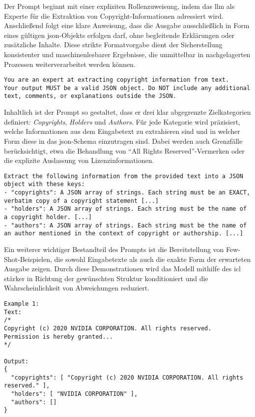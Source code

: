 Der Prompt beginnt mit einer expliziten Rollenzuweisung, indem das \gls{llm} als Experte für die Extraktion von Copyright-Informationen adressiert wird.
Anschließend folgt eine klare Anweisung, dass die Ausgabe ausschließlich in Form eines gültigen \gls{json}-Objekts erfolgen darf, ohne begleitende Erklärungen oder zusätzliche Inhalte.
Diese strikte Formatvorgabe dient der Sicherstellung konsistenter und maschinenlesbarer Ergebnisse, die unmittelbar in nachgelagerten Prozessen weiterverarbeitet werden können.

\begin{lstlisting}[keepspaces=true]
You are an expert at extracting copyright information from text.
Your output MUST be a valid JSON object. Do NOT include any additional text, comments, or explanations outside the JSON.
\end{lstlisting}

Inhaltlich ist der Prompt so gestaltet, dass er drei klar abgegrenzte Zielkategorien definiert: \textit{Copyrights}, \textit{Holders} und \textit{Authors}.
Für jede Kategorie wird präzisiert, welche Informationen aus dem Eingabetext zu extrahieren sind und in welcher Form diese in das \gls{json}-Schema einzutragen sind.
Dabei werden auch Grenzfälle berücksichtigt, etwa die Behandlung von \enquote{All Rights Reserved}-Vermerken oder die explizite Auslassung von Lizenzinformationen.

\begin{lstlisting}[keepspaces=true]
Extract the following information from the provided text into a JSON object with these keys:
- "copyrights": A JSON array of strings. Each string must be an EXACT, verbatim copy of a copyright statement [...]
- "holders": A JSON array of strings. Each string must be the name of a copyright holder. [...]
- "authors": A JSON array of strings. Each string must be the name of an author mentioned in the context of copyright or authorship. [...]
\end{lstlisting}

Ein weiterer wichtiger Bestandteil des Prompts ist die Bereitstellung von Few-Shot-Beispielen, die sowohl Eingabetexte als auch die exakte Form der erwarteten Ausgabe zeigen.
Durch diese Demonstrationen wird das Modell mithilfe des \gls{icl} stärker in Richtung der gewünschten Struktur konditioniert und die Wahrscheinlichkeit von Abweichungen reduziert.

\begin{lstlisting}[keepspaces=true]
Example 1:
Text:
/*
Copyright (c) 2020 NVIDIA CORPORATION. All rights reserved.
Permission is hereby granted...
*/

Output:
{
  "copyrights": [ "Copyright (c) 2020 NVIDIA CORPORATION. All rights reserved." ],
  "holders": [ "NVIDIA CORPORATION" ],
  "authors": []
}
\end{lstlisting}

